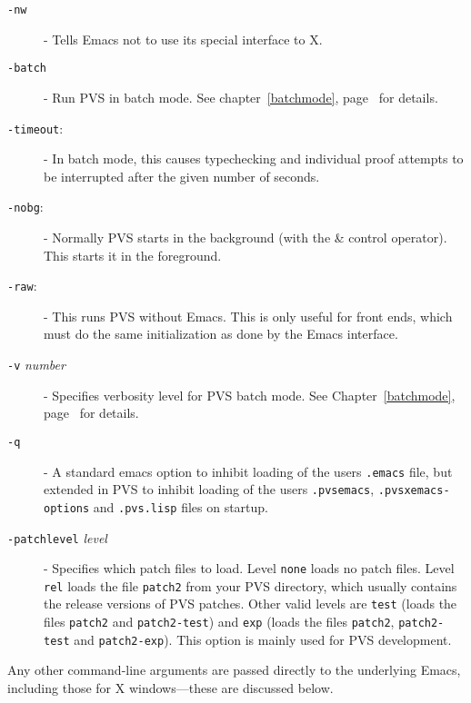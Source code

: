 \begin{description}
\item[\texttt{-nw}]
  - Tells Emacs not to use its special interface to X.

\item[\texttt{-batch}]
  - Run PVS in batch mode. See chapter~\ref{batchmode},
  page~\pageref{batchmode} for details.

\item[\texttt{-timeout}:]
  - In batch mode, this causes typechecking
  and individual proof attempts to be interrupted after the given number
  of seconds.

\item[\texttt{-nobg}:]
  - Normally PVS starts in
  the background (with the \& control operator).  This starts it in the
  foreground.

\item[\texttt{-raw}:]
  - This runs PVS without
  Emacs.  This is only useful for front ends, which must do the same
  initialization as done by the Emacs interface.

\item[\texttt{-v} \emph{number}]
  - Specifies verbosity level for PVS batch mode. See Chapter~\ref{batchmode},
  page~\pageref{batchmode} for details.

\label{dash-q-option}
\item[\texttt{-q}]
  - A standard emacs option to
  inhibit loading of the users {\tt .emacs} file, but extended in PVS to
  inhibit loading of the users {\tt .pvsemacs}, {\tt .pvsxemacs-options}
  and \texttt{.pvs.lisp} files on startup.

\item[\texttt{-patchlevel} \emph{level}]
  - Specifies which
  patch files to load. Level \texttt{none} loads no patch files. Level
  \texttt{rel} loads the file \texttt{patch2} from your PVS directory,
  which usually contains the release versions of PVS patches. Other valid
  levels are \texttt{test} (loads the files \texttt{patch2} and
  \texttt{patch2-test}) and \texttt{exp} (loads the files \texttt{patch2},
  \texttt{patch2-test} and \texttt{patch2-exp}).  This option is mainly
  used for PVS development.


\end{description}
Any other command-line arguments are passed directly to the underlying
Emacs, including those for X windows---these are discussed
below.

